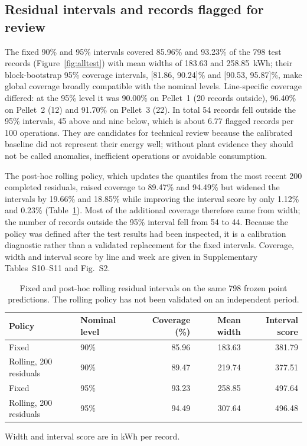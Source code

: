 \subsection{Residual intervals and records flagged for review}
The fixed 90\% and 95\% intervals covered 85.96\% and 93.23\% of the 798 test records (Figure~\ref{fig:alltest}) with mean widths of 183.63 and 258.85~kWh; their block-bootstrap 95\% coverage intervals, [81.86, 90.24]\% and [90.53, 95.87]\%, make global coverage broadly compatible with the nominal levels. Line-specific coverage differed: at the 95\% level it was 90.00\% on Pellet~1 (20 records outside), 96.40\% on Pellet~2 (12) and 91.70\% on Pellet~3 (22). In total 54 records fell outside the 95\% intervals, 45 above and nine below, which is about 6.77 flagged records per 100 operations. They are candidates for technical review because the calibrated baseline did not represent their energy well; without plant evidence they should not be called anomalies, inefficient operations or avoidable consumption.


The post-hoc rolling policy, which updates the quantiles from the most recent 200 completed residuals, raised coverage to 89.47\% and 94.49\% but widened the intervals by 19.66\% and 18.85\% while improving the interval score by only 1.12\% and 0.23\% (Table~\ref{tab:intervals}). Most of the additional coverage therefore came from width; the number of records outside the 95\% interval fell from 54 to 44. Because the policy was defined after the test results had been inspected, it is a calibration diagnostic rather than a validated replacement for the fixed intervals. Coverage, width and interval score by line and week are given in Supplementary Tables~S10--S11 and Fig.~S2.

\begin{table}[!htbp]\centering\small\setlength{\tabcolsep}{4.5pt}
\caption{Fixed and post-hoc rolling residual intervals on the same 798 frozen point predictions. The rolling policy has not been validated on an independent period.}\label{tab:intervals}
\begin{tabular}{@{}llrrr@{}}\toprule
Policy & Nominal level & Coverage (\%) & Mean width & Interval score \\\midrule
Fixed & 90\% & 85.96 & 183.63 & 381.79 \\
Rolling, 200 residuals & 90\% & 89.47 & 219.74 & 377.51 \\
Fixed & 95\% & 93.23 & 258.85 & 497.64 \\
Rolling, 200 residuals & 95\% & 94.49 & 307.64 & 496.48 \\\bottomrule
\end{tabular}\par\vspace{4pt}\footnotesize Width and interval score are in kWh per record.
\end{table}
